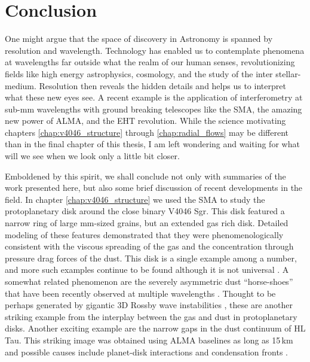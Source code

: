 \chapter{Conclusion} \label{chap:conclusion}

One might argue that the space of discovery in Astronomy is spanned by resolution and 
wavelength.  Technology has enabled us to contemplate phenomena at wavelengths far outside 
what the realm of our human senses, revolutionizing fields like high energy astrophysics,
cosmology, and the study of the inter stellar-medium.  Resolution then reveals the hidden
details and helps us to interpret what these new eyes see.  A recent example is 
the application of interferometry at sub-mm wavelengths with ground breaking telescopes like the SMA, 
the amazing new power of ALMA, and the EHT revolution.  
While the science motivating chapters \ref{chap:v4046_structure} 
through \ref{chap:radial_flows} may be different than in the final chapter of this thesis, 
I am left wondering and waiting for what will we see when we look only a little bit closer.

Emboldened by this spirit, we shall conclude not only with summaries of the work presented here,
but also some brief discussion of recent developments in the field.  In chapter \ref{chap:v4046_structure} we 
used the SMA to study the protoplanetary disk 
around the close binary V4046 Sgr.  This disk featured a narrow ring of large mm-sized grains, 
but an extended gas rich disk.  Detailed modeling of these features demonstrated that they were 
phenomenologically consistent with the viscous spreading of the gas and the concentration through pressure 
drag forces of the dust.  This disk is a single example among a number, and more such examples continue to be 
found \citep{isella07,panic09,andrews12,degregorio-monsalvo13,ke14} although it is not universal 
\citep{huelamo15}.  A somewhat related phenomenon are the 
severely asymmetric dust  ``horse-shoes'' that have been recently observed at multiple wavelengths
\citep{vandermarel13,fukagawa13,isella13,casassus15,marino15}.  Thought to be perhaps generated by gigantic 
3D Rossby wave instabilities \citep{regaly13}, these are another striking example from the interplay between
the gas and dust in protoplanetary disks.  Another exciting example are the narrow gaps in the dust continuum
of HL Tau. This striking image was obtained using ALMA baselines as long as 15\,km and possible causes include
planet-disk interactions and condensation fronts \citep{brogan14,zhang15}.

